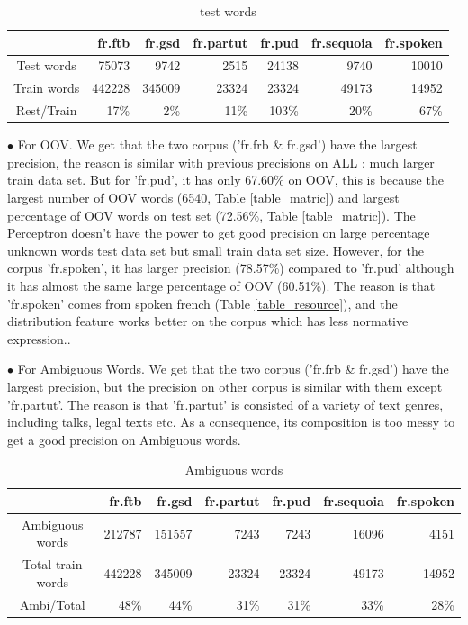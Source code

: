 \documentclass{article}
\begin{document}
\begin{table}[h]
\caption{test words}
\vspace{5pt}
\centering
\begin{tabular}{|c|r|r|r|r|r|r|}
\hline
\ & fr.ftb & fr.gsd & fr.partut & fr.pud & fr.sequoia & fr.spoken \\
\hline
Test words & 75073 & 9742 & 2515 & 24138 & 9740 & 10010 \\
\hline
Train words & 442228 & 345009 & 23324 & 23324 & 49173 & 14952 \\
\hline
Rest/Train & 17\% & 2\% & 11\% & 103\% & 20\% & 67\%\\  
\hline
\end{tabular}
\label{test_on_train}
\end{table}


$\bullet$ For OOV. We get that the two corpus ('fr.frb \& fr.gsd') have the largest precision, the reason is similar with previous precisions on ALL : much larger train data set. But for 'fr.pud', it has only 67.60\% on OOV, this is because the largest number of OOV words (6540, Table \ref{table_matric}) and largest percentage of OOV words on test set (72.56\%, Table  \ref{table_matric}). The Perceptron doesn't have the power to get good precision on large percentage unknown words test data set but small train data set size. However, for the corpus 'fr.spoken', it has larger precision (78.57\%) compared to 'fr.pud' although it has almost the same large percentage of OOV (60.51\%). The reason is that 'fr.spoken' comes from spoken french (Table \ref{table_resource}), and the distribution feature works better on the corpus which has less normative expression.. 

$\bullet$ For Ambiguous Words. We get that the two corpus ('fr.frb \& fr.gsd') have the largest precision, but the precision on other corpus is similar with them except 'fr.partut'. The reason is that 'fr.partut' is consisted of a variety of text genres, including talks, legal texts etc. As a consequence, its composition is too messy to get a good precision on Ambiguous words.



\begin{table}[h]
\caption{Ambiguous words}
\vspace{5pt}
\centering
\begin{tabular}{|c|r|r|r|r|r|r|}
\hline
\ & fr.ftb & fr.gsd & fr.partut & fr.pud & fr.sequoia & fr.spoken \\
\hline
Ambiguous words & 212787 & 151557 & 7243 & 7243 & 16096 & 4151 \\
\hline
Total train words & 442228 & 345009 & 23324 & 23324 & 49173 & 14952 \\
\hline
Ambi/Total & 48\% & 44\% & 31\% & 31\% & 33\% & 28\%\\  
\hline
\end{tabular}
\end{table}
\end{document}
